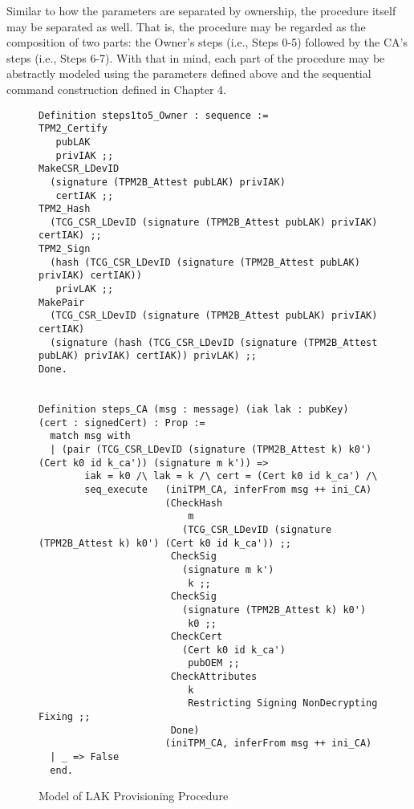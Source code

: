 \documentclass[runningheads]{llncs}
\begin{document}



 Similar to how the parameters are separated by ownership, the procedure itself may be separated as well. That is, the procedure may be regarded as the composition of two parts: the Owner's steps (i.e., Steps 0-5) followed by the CA's steps (i.e., Steps 6-7).
 With that in mind, each part of the procedure may be abstractly modeled using the parameters defined above and the sequential command construction defined in Chapter 4. 
\begin{figure}[h!]
\begin{lstlisting}[language=Coq]
Definition steps1to5_Owner : sequence :=
TPM2_Certify 
   pubLAK 
   privIAK ;;
MakeCSR_LDevID 
  (signature (TPM2B_Attest pubLAK) privIAK) 
   certIAK ;;
TPM2_Hash 
  (TCG_CSR_LDevID (signature (TPM2B_Attest pubLAK) privIAK) certIAK) ;;
TPM2_Sign 
  (hash (TCG_CSR_LDevID (signature (TPM2B_Attest pubLAK) privIAK) certIAK)) 
   privLAK ;;
MakePair 
  (TCG_CSR_LDevID (signature (TPM2B_Attest pubLAK) privIAK) certIAK) 
  (signature (hash (TCG_CSR_LDevID (signature (TPM2B_Attest pubLAK) privIAK) certIAK)) privLAK) ;;
Done. 


Definition steps_CA (msg : message) (iak lak : pubKey) (cert : signedCert) : Prop :=
  match msg with
  | (pair (TCG_CSR_LDevID (signature (TPM2B_Attest k) k0') (Cert k0 id k_ca')) (signature m k')) =>
        iak = k0 /\ lak = k /\ cert = (Cert k0 id k_ca') /\
        seq_execute   (iniTPM_CA, inferFrom msg ++ ini_CA)
                      (CheckHash 
                          m
                         (TCG_CSR_LDevID (signature (TPM2B_Attest k) k0') (Cert k0 id k_ca')) ;;
                       CheckSig
                         (signature m k') 
                          k ;;
                       CheckSig 
                         (signature (TPM2B_Attest k) k0') 
                          k0 ;;
                       CheckCert 
                         (Cert k0 id k_ca') 
                          pubOEM ;;
                       CheckAttributes 
                          k 
                          Restricting Signing NonDecrypting Fixing ;;
                       Done)
                      (iniTPM_CA, inferFrom msg ++ ini_CA)
  | _ => False
  end.
\end{lstlisting}
\caption{Model of LAK Provisioning Procedure}
\label{fig:lak_model}
\end{figure}
\end{document}
